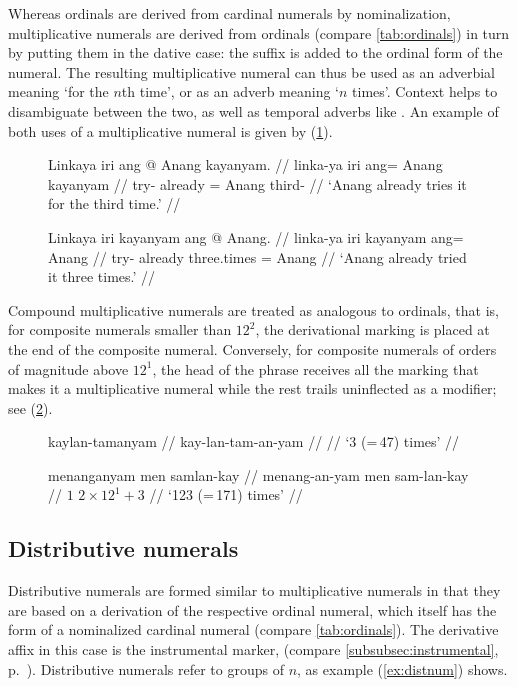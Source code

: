 Whereas ordinals are derived from cardinal numerals by nominalization,
multiplicative numerals are derived from ordinals (compare
\autoref{tab:ordinals}) in turn by putting them in the dative case: the suffix
 is added to the ordinal form of the numeral. The resulting
multiplicative numeral can thus be used as an adverbial meaning `for the $n$th
time', or as an adverb meaning `$n$ times'. Context helps to disambiguate
between the two, as well as temporal adverbs like . An
example of both uses of a multiplicative numeral is given by 
(\ref{ex:multnumwo}).

\begin{figure}[h]
\pex\label{ex:multnumwo}
\a\begingl
	\gla Linkaya iri ang @ Anang kayanyam. //
	\glb linka-ya iri ang= Anang kayanyam //
	\glc try-\TsgM{} already \Aarg{}= Anang third-\Dat{} //
	\glft `Anang already tries it for the third time.' //
\endgl

\a\begingl
	\gla Linkaya iri kayanyam ang @ Anang. //
	\glb linka-ya iri kayanyam ang= Anang //
	\glc try-\TsgM{} already three.times \Aarg{}= Anang //
	\glft `Anang already tried it three times.' //
\endgl
\xe
\end{figure}

Compound multiplicative numerals are treated as analogous to ordinals, that is,
for composite numerals smaller than $12^2$, the derivational marking is placed
at the end of the composite numeral. Conversely, for composite numerals of
orders of magnitude above $12^1$, the head of the phrase receives all the
marking that makes it a multiplicative numeral while the rest trails
uninflected as a modifier; see (\ref{ex:mutlnuminfl}).

\begin{figure}[h]
\pex\label{ex:mutlnuminfl}
\a\begingl
	\gla kaylan-tamanyam //
	\glb kay-lan-tam-an-yam //
	 //
	\glft `3\elv{} (=\,47) times' //
\endgl

\a\begingl
	\gla menanganyam men samlan-kay //
	\glb menang-an-yam men sam-lan-kay //
	 {$1$} {$2 \times 12^1 + 3$} //
	\glft `123 (=\,171) times' //
\endgl
\xe
\end{figure}

\subsection{Distributive numerals}

Distributive numerals are formed similar to multiplicative numerals in that
they are based on a derivation of the respective ordinal numeral, which itself
has the form of a nominalized cardinal numeral (compare
\autoref{tab:ordinals}). The derivative affix in this case is the instrumental
marker,  (compare \autoref{subsubsec:instrumental},
p.~\pageref{subsubsec:instrumental}).
Distributive numerals refer to groups of $n$, as example (\ref{ex:distnum})
shows.

